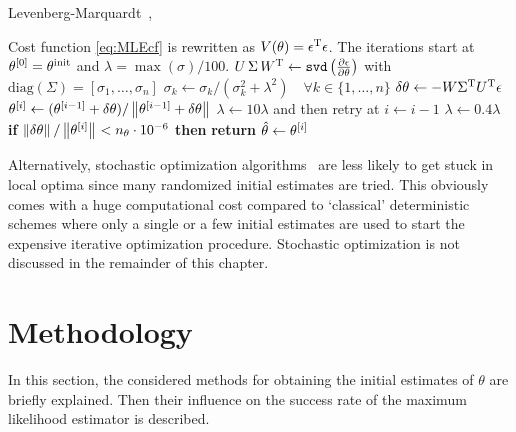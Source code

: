 \begin{algorithm}
\caption{Levenberg-Marquardt~\citep{Marquardt1963}, \citep[Sec. 9.L.4]{Pintelon2012}}\label{LMalgo}
\begin{algorithmic}[1]
  \Statex Cost function \eqref{eq:MLEcf} is rewritten as $V(\theta) = \epsilon^{\mathrm{T}} \epsilon$. 
  \Statex The iterations start at ${\theta}^{[0]} = \theta^{\mathrm{init}}$ and $\lambda = \max(\sigma)/100$.
      \State $U \, \Sigma \, W^{\mathrm{T}} \gets \mathtt{svd}\left( \frac{\partial \epsilon}{\partial \theta}\right)$ with $\mathrm{diag}(\Sigma) = [\sigma_1, \ldots, \sigma_n]$
      \State $\sigma_k \gets \sigma_k / (\sigma_k^2 + \lambda^2) \quad \forall k \in \{1, \ldots, n\}$
      \State $\delta\theta \gets - W  \Sigma^{\mathrm{T}}  U^{\mathrm{T}} \epsilon$
      \State ${\theta}^{[i]} \gets ({\theta}^{[i-1]} + \delta\theta) / \left\| {\theta}^{[i-1]} + \delta\theta \right\|_{} $
          \State $\lambda \gets 10 \lambda$ and then retry at $i \gets i - 1$
      \Else
          \State $\lambda \gets 0.4 \lambda$
      \EndIf
      \State \textbf{if} $\left\| \delta\theta \right\|_{}/\left\| {\theta}^{[i]} \right\|_{} < n_{\theta}  \cdot 10^{-6} $ \textbf{then} \textbf{return} $\hat{\theta} \gets {\theta}^{[i]}$
   \EndFor
\end{algorithmic}
\end{algorithm}

\begin{remark}
Alternatively, stochastic optimization algorithms~\citep{Spall2012,Press2007} are less likely to get stuck in local optima since many randomized initial estimates are tried.
This obviously comes with a huge computational cost compared to `classical' deterministic schemes where only a single or a few initial estimates are used to start the expensive iterative optimization procedure.
Stochastic optimization is not discussed in the remainder of this chapter.
\end{remark}

\section{Methodology}\label{se:MethodEg}
In this section, the considered methods for obtaining the initial estimates of $\theta$ are briefly explained. Then their influence on the success rate of the maximum likelihood estimator is described.

